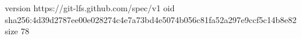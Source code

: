 version https://git-lfs.github.com/spec/v1
oid sha256:4d39d2787ee00e028274c4e7a73bd4e5074b056c81fa52a297e9ccf5c14b8e82
size 78
